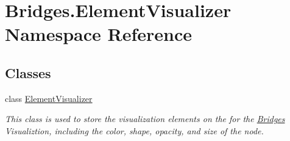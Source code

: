 \hypertarget{namespace_bridges_1_1_element_visualizer}{}\section{Bridges.\+Element\+Visualizer Namespace Reference}
\label{namespace_bridges_1_1_element_visualizer}
\subsection*{Classes}
\begin{DoxyCompactItemize}
\item 
class \hyperlink{class_bridges_1_1_element_visualizer_1_1_element_visualizer}{Element\+Visualizer}
\begin{DoxyCompactList}\small\item\em This class is used to store the visualization elements on the for the \hyperlink{namespace_bridges_1_1_bridges}{Bridges} Visualiztion, including the color, shape, opacity, and size of the node. \end{DoxyCompactList}\end{DoxyCompactItemize}

